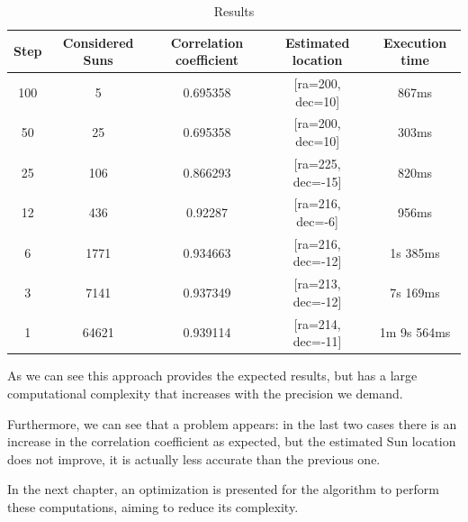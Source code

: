 \begin{table}[h!]
	\centering
	\def\arraystretch{1.2}
	\begin{tabular}{|c c c c c|} 
		\hline
		Step & Considered Suns & Correlation coefficient & Estimated location & Execution time \\ [0.5ex] 
		\hline\hline
		100 & 5 & 0.695358 & [ra=200, dec=10] & 867ms \\
		\hline 
		50 & 25 & 0.695358 & [ra=200, dec=10] & 303ms \\
			\hline 
		25 & 106 & 0.866293 & [ra=225, dec=-15] & 820ms \\
			\hline 
		12 & 436 & 0.92287 & [ra=216, dec=-6] & 956ms \\
			\hline 
		6 & 1771 & 0.934663 & [ra=216, dec=-12] & 1s 385ms \\
			\hline 
		3 & 7141 & 0.937349 & [ra=213, dec=-12] & 7s 169ms \\
			\hline 
		1 & 64621 & 0.939114 & [ra=214, dec=-11] & 1m 9s 564ms \\
		\hline 
	\end{tabular}
	\caption{Results}
\end{table}

As we can see this approach provides the expected results, but has a large computational complexity that increases with the precision we demand. 

Furthermore, we can see that a problem appears: in the last two cases there is an increase in the correlation coefficient as expected, but the estimated Sun location does not improve, it is actually less accurate than the previous one.

In the next chapter, an optimization is presented for the algorithm to perform these computations, aiming to reduce its complexity.